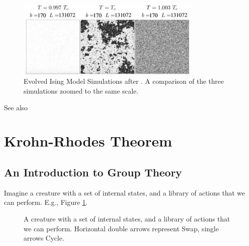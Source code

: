 \documentclass[]{article}
\begin{document}
\begin{figure}[H]
	\begin{center}
		\caption[Evolved Ising Model Simulations after \cite{ashton2012renormalization}]{Evolved Ising Model Simulations after \cite{ashton2012renormalization}. A comparison of the three simulations zoomed to the same scale.}
		\includegraphics[width=0.8\textwidth]{DouglasAshtonSummary}
	\end{center}
\end{figure}

See also \cite{dedeo2012dynamics}

\section{Krohn-Rhodes Theorem}

\subsection{An Introduction to Group Theory}

Imagine a creature with a set of internal states, and a library of actions that we can perform. E.g., Figure \ref{fig:copy:swap}.

\begin{figure}[H]
	\begin{center}
		\caption[A creature with a set of internal states]{A creature with a set of internal states, and a library of actions that we can perform. Horizontal double arrows represent Swap, single arrows Cycle.}\label{fig:copy:swap}
	\end{center}
\end{figure}
\end{document}

